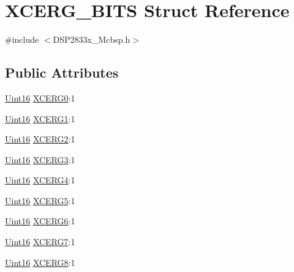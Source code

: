 \hypertarget{struct_x_c_e_r_g___b_i_t_s}{}\section{X\+C\+E\+R\+G\+\_\+\+B\+I\+T\+S Struct Reference}
\label{struct_x_c_e_r_g___b_i_t_s}


{\ttfamily \#include $<$D\+S\+P2833x\+\_\+\+Mcbsp.\+h$>$}

\subsection*{Public Attributes}
\begin{DoxyCompactItemize}
\item 
\hyperlink{_d_s_p2833x___device_8h_a59a9f6be4562c327cbfb4f7e8e18f08b}{Uint16} \hyperlink{struct_x_c_e_r_g___b_i_t_s_aefe12fb8bc6a588c492266edb7347733}{X\+C\+E\+R\+G0}\+:1
\item 
\hyperlink{_d_s_p2833x___device_8h_a59a9f6be4562c327cbfb4f7e8e18f08b}{Uint16} \hyperlink{struct_x_c_e_r_g___b_i_t_s_a5eca45f72de9429f2b6a7039551b1aab}{X\+C\+E\+R\+G1}\+:1
\item 
\hyperlink{_d_s_p2833x___device_8h_a59a9f6be4562c327cbfb4f7e8e18f08b}{Uint16} \hyperlink{struct_x_c_e_r_g___b_i_t_s_a47b6d08ac2361eaa56dc0adae905284f}{X\+C\+E\+R\+G2}\+:1
\item 
\hyperlink{_d_s_p2833x___device_8h_a59a9f6be4562c327cbfb4f7e8e18f08b}{Uint16} \hyperlink{struct_x_c_e_r_g___b_i_t_s_a3defd968a8205d2b79f432faa4ead6f8}{X\+C\+E\+R\+G3}\+:1
\item 
\hyperlink{_d_s_p2833x___device_8h_a59a9f6be4562c327cbfb4f7e8e18f08b}{Uint16} \hyperlink{struct_x_c_e_r_g___b_i_t_s_ab42281470c600791bdf189488d9854dd}{X\+C\+E\+R\+G4}\+:1
\item 
\hyperlink{_d_s_p2833x___device_8h_a59a9f6be4562c327cbfb4f7e8e18f08b}{Uint16} \hyperlink{struct_x_c_e_r_g___b_i_t_s_a87741da21cb2047b47f2624e849a5f13}{X\+C\+E\+R\+G5}\+:1
\item 
\hyperlink{_d_s_p2833x___device_8h_a59a9f6be4562c327cbfb4f7e8e18f08b}{Uint16} \hyperlink{struct_x_c_e_r_g___b_i_t_s_a7ec97f50aba7e39ead3cc3e7be722a53}{X\+C\+E\+R\+G6}\+:1
\item 
\hyperlink{_d_s_p2833x___device_8h_a59a9f6be4562c327cbfb4f7e8e18f08b}{Uint16} \hyperlink{struct_x_c_e_r_g___b_i_t_s_acaa8467fcfd5d28531ee96152f098fbe}{X\+C\+E\+R\+G7}\+:1
\item 
\hyperlink{_d_s_p2833x___device_8h_a59a9f6be4562c327cbfb4f7e8e18f08b}{Uint16} \hyperlink{struct_x_c_e_r_g___b_i_t_s_ab0d504d9c7b3502b9d6e42de48d4a7cb}{X\+C\+E\+R\+G8}\+:1

\end{DoxyCompactItemize}
